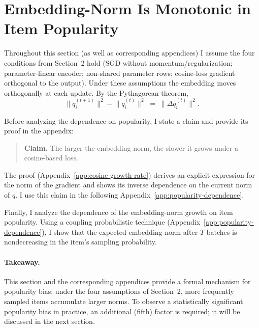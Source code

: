 \section{Embedding-Norm Is Monotonic in Item Popularity}
\label{sec:norm-monotonicity}

Throughout this section (as well as corresponding appendices) I assume the four conditions from Section~2 hold (SGD without momentum/regularization; parameter-linear encoder; non-shared parameter rows; cosine-loss gradient orthogonal to the output). Under these assumptions the embedding moves orthogonally at each update. By the Pythagorean theorem,
\begin{equation}
\label{eq:pythagoras-increment}
\bigl\|q_i^{(t+1)}\bigr\|^{2} - \bigl\|q_i^{(t)}\bigr\|^{2} \;=\; \bigl\|\Delta q_i^{(t)}\bigr\|^{2}.
\end{equation}

Before analyzing the dependence on popularity, I state a claim and provide its proof in the appendix:
\begin{quote}
\textbf{Claim.} The larger the embedding norm, the slower it grows under a cosine-based loss.
\end{quote}
The proof (Appendix~\ref{app:cosine-growth-rate}) derives an explicit expression for the norm of the gradient and shows its inverse dependence on the current norm of $q$.
I use this claim in the following Appendix~\ref{app:popularity-dependence}.

Finally, I analyze the dependence of the embedding-norm growth on item popularity. Using a coupling probabilistic technique (Appendix~\ref{app:popularity-dependence}), I show that the expected embedding norm after $T$ batches is nondecreasing in the item's sampling probability.

\paragraph{Takeaway.} This section and the corresponding appendices provide a formal mechanism for popularity bias: under the four assumptions of Section~2, more frequently sampled items accumulate larger norms. 
To observe a statistically significant popularity bias in practice, an additional (fifth) factor is required; it will be discussed in the next section.


